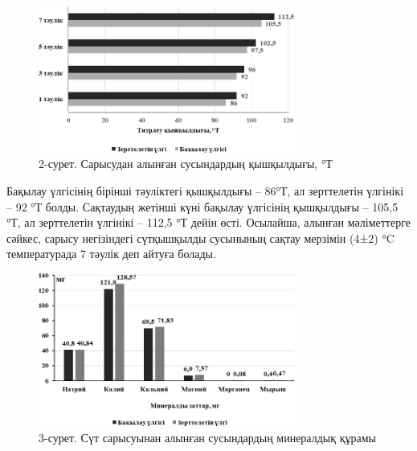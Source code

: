 \begin{figure}[H]
	\centering
	\includegraphics[width=0.75\textwidth]{media/pish4/image3}
	\caption*{2-сурет. Сарысудан алынған сусындардың қышқылдығы, °Т}
\end{figure}

\begin{multicols}{2}
Бақылау үлгісінің бірінші тәуліктегі қышқылдығы -- 86°Т, ал зерттелетін
үлгінікі -- 92 °Т болды. Сақтаудың жетінші күні бақылау үлгісінің
қышқылдығы -- 105,5 °Т, ал зерттелетін үлгінікі -- 112,5 °Т дейін өсті.
Осылайша, алынған мәліметтерге сәйкес, сарысу негізіндегі сүтқышқылды
сусынының сақтау мерзімін (4±2) °C температурада 7 тәулік деп айтуға
болады.
\end{multicols}

\begin{figure}[H]
	\centering
	\includegraphics[width=0.75\textwidth]{media/pish4/image4}
	\caption*{3-сурет. Сүт сарысуынан алынған сусындардың минералдық құрамы}
\end{figure}

